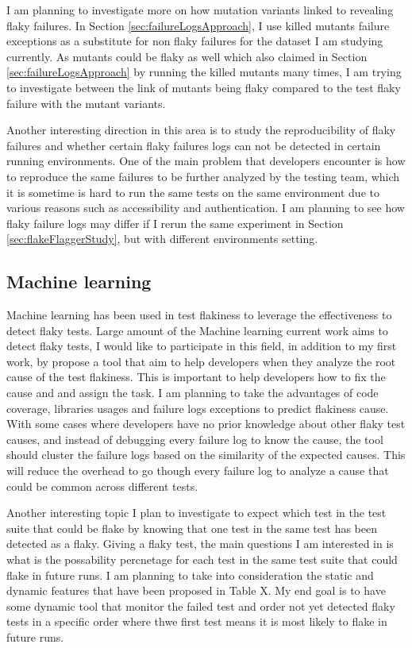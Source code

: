 I am planning to investigate more on how mutation variants linked to revealing flaky failures. In Section \ref{sec:failureLogsApproach}, I use killed mutants failure exceptions as a substitute for non flaky failures for the dataset I am studying currently. As mutants could be flaky as well which also claimed in Section \ref{sec:failureLogsApproach} by running the killed mutants many times, I am trying to investigate between the link of mutants being flaky compared to the test flaky failure with the mutant variants. 

Another interesting direction in this area is to study the reproducibility of flaky failures and whether certain flaky failures logs can not be detected in certain running environments. One of the main problem that developers encounter is how to reproduce the same failures to be further analyzed by the testing team, which it is sometime is hard to run the same tests on the same environment due to various reasons such as accessibility and authentication. I am planning to see how flaky failure logs may differ if I rerun the same experiment in Section \ref{sec:flakeFlaggerStudy}, but with different environments setting.


\subsection{Machine learning}

Machine learning has been used in test flakiness to leverage the effectiveness to detect flaky tests. Large amount of the Machine learning current work aims to detect flaky tests, I would like to participate in this field, in addition to my first work, by propose a tool that aim to help developers when they analyze the root cause of the test flakiness. This is important to help developers how to fix the cause and and assign the task. I am planning to take the advantages of code coverage, libraries usages and failure logs exceptions to predict flakiness cause. With some cases where developers have no prior knowledge about other flaky test causes, and instead of debugging every failure log to know the cause, the tool should cluster the failure logs based on the similarity of the expected causes. This will reduce the overhead to go though every failure log to analyze a cause that could be common across different tests. 

Another interesting topic I plan to investigate to expect which test in the test suite that could be flake by knowing that one test in the same test has been detected as a flaky. Giving a flaky test, the main questions I am interested in is what is the possability percnetage for each test in the same test suite that could flake in future runs. I am planning to take into consideration the static and dynamic features that have been proposed in Table X. My end goal is to have some dynamic tool that monitor the failed test and order not yet detected flaky tests in a specific order where thwe first test means it is most likely to flake in future runs. 


